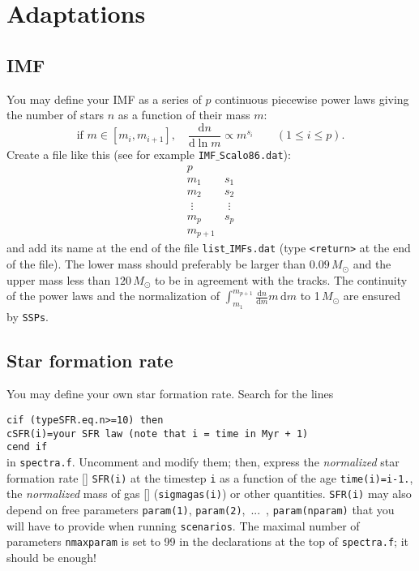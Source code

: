 \documentclass[11pt,draft,fleqn]{article}
\begin{document}
\section{Adaptations}
\subsection{IMF}
You may define your IMF as a series of $p$ continuous piecewise power laws
giving the number of stars $n$ as a function of their mass $m$:
\[\textrm{if }m\in[m_i, m_{i+1}],\quad \frac{\mathrm{d}n}{\mathrm{d}\ln m}\propto
m^{s_i}\qquad (1\le i\le p).\]
Create a file like this (see for example \texttt{IMF$\_$Scalo86.dat}):
\[
\begin{array}{ll}
p & \\
m_1 & s_1\\
m_2 & s_2\\
\,\,\vdots & \,\,\vdots\\
m_p & s_p\\
m_{p+1} &
\end{array}
\]
and add its name at the end of the file 
\texttt{list$\_$IMFs.dat} (type \texttt{<return>} at the end of the file).
The lower mass should preferably be larger than $0.09\,M_{\odot}$ and the upper
mass less than $120\,M_{\odot}$ to be in agreement with the tracks.
The continuity of the power laws and the normalization of
$\displaystyle{\int_{m_1}^{m_{p+1}}\frac{\mathrm{d}n}{\mathrm{d}m}m\,\mathrm{d}m}$ to
1\,$M_{\odot}$ are ensured by \texttt{SSPs}.
\subsection{Star formation rate}
\label{ownSFR}
You may define your own star formation rate.
Search for the lines

\noindent\hspace*{1cm}\texttt{c\hspace*{1cm}if (typeSFR.eq.n>=10) then}\\
\hspace*{1cm}\texttt{c\hspace*{2cm}SFR(i)=your SFR law (note that i = time in Myr + 1)}\\
\hspace*{1cm}\texttt{c\hspace*{1cm}end if}\\
in \texttt{spectra.f}. Uncomment and modify them; then, express the \emph{normalized} star formation
rate [\dag] \texttt{SFR(i)} at the timestep \texttt{i}
as a function of the age \texttt{time(i)=i-1.}, the \emph{normalized}
mass of gas [\dag]
(\texttt{sigmagas(i)}) or other quantities.
\texttt{SFR(i)} may also depend on free parameters \texttt{param(1)},
\texttt{param(2)},~...~, \texttt{param(nparam)} that you will have to 
provide when running \texttt{scenarios}. The maximal number
of parameters \texttt{nmaxparam} is set to 99
in the declarations at the top of \texttt{spectra.f}; it should be enough!
\end{document}
